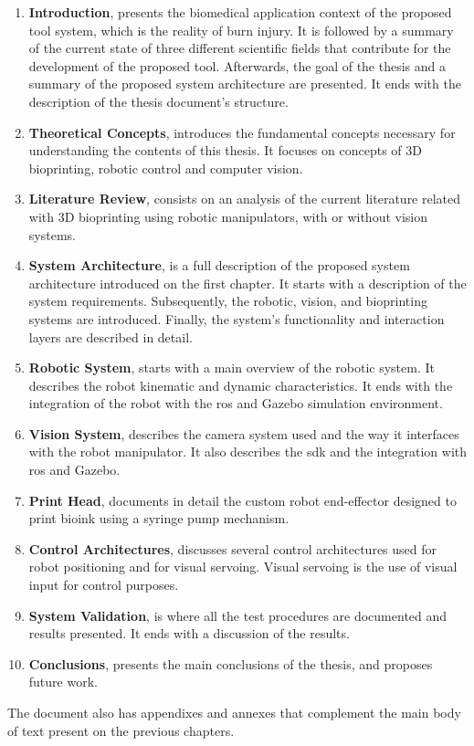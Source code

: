 \begin{enumerate}
    \item \textbf{Introduction}, presents the biomedical application context of the proposed tool system, which is the reality of burn injury. It is followed by a summary of the current state of three different scientific fields that contribute for the development of the proposed tool. Afterwards, the goal of the thesis and a summary of the proposed system architecture are presented. It ends with the description of the thesis document's structure.
    
    \item \textbf{Theoretical Concepts}, introduces the fundamental concepts necessary for understanding the contents of this thesis. It focuses on concepts of 3D bioprinting, robotic control and computer vision. 
    
    \item \textbf{Literature Review}, consists on an analysis of the current literature related with 3D bioprinting using robotic manipulators, with or without vision systems.
    
    \item \textbf{System Architecture}, is a full description of the proposed system architecture introduced on the first chapter. It starts with a description of the system requirements. Subsequently, the robotic, vision, and bioprinting systems are introduced. Finally, the system's functionality and interaction layers are described in detail.
    
    \item \textbf{Robotic System}, starts with a main overview of the robotic system. It describes the robot kinematic and dynamic characteristics. It ends with the integration of the robot with the \gls{ros} and Gazebo simulation environment.
    
    \item \textbf{Vision System}, describes the camera system used and the way it interfaces with the robot manipulator. It also describes the \gls{sdk} and the integration with \gls{ros} and Gazebo.
    
    \item \textbf{Print Head}, documents in detail the custom robot end-effector designed to print bioink using a syringe pump mechanism.
    
    \item \textbf{Control Architectures}, discusses several control architectures used for robot positioning and for visual servoing. Visual servoing is the use of visual input for control purposes.
    
    \item \textbf{System Validation}, is where all the test procedures are documented and results presented. It ends with a discussion of the results.
    
    \item \textbf{Conclusions}, presents the main conclusions of the thesis, and proposes future work.
\end{enumerate}

The document also has appendixes and annexes that complement the main body of text present on the previous chapters.

